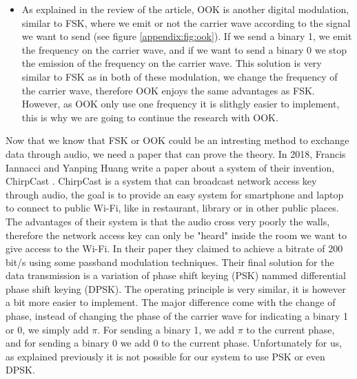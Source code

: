 \documentclass[twocolumn,14pt]{extarticle}
\begin{document}
\begin{itemize}
\item As explained in the review of the article, OOK is another digital modulation, similar to FSK, where we emit or not the carrier wave according to the signal we want to send (see figure \ref{appendix:fig:ook}). If we send a binary 1, we emit the frequency on the carrier wave, and if we want to send a binary 0 we stop the emission of the frequency on the carrier wave. This solution is very similar to FSK as in both of these modulation, we change the frequency of the carrier wave, therefore OOK enjoys the same advantages as FSK. However, as OOK only use one frequency it is slithgly easier to implement, this is why we are going to continue the research with OOK.
\end{itemize}

Now that we know that FSK or OOK could be an intresting method to exchange data through audio, we need a paper that can prove the theory. In 2018, Francis Iannacci and Yanping Huang write a paper about a system of their invention, ChirpCast \cite{ChirpCast}. ChirpCast is a system that can broadcast network access key through audio, the goal is to provide an easy system for smartphone and laptop to connect to public Wi-Fi, like in restaurant, library or in other public places. The advantages of their system is that the audio cross very poorly the walls, therefore the network access key can only be "heard" inside the room we want to give access to the Wi-Fi. In their paper they claimed to achieve a bitrate of 200 bit/s using some passband modulation techniques. Their final solution for the data transmission is a variation of phase shift keying (PSK) nammed differential phase shift keying (DPSK). The operating principle is very similar, it is however a bit more easier to implement. The major difference come with the change of phase, instead of changing the phase of the carrier wave for indicating a binary 1 or 0, we simply add $\pi$. For sending a binary 1, we add $\pi$ to the current phase, and for sending a binary 0 we add 0 to the current phase. Unfortunately for us, as explained previously it is not possible for our system to use PSK or even DPSK.
\end{document}
